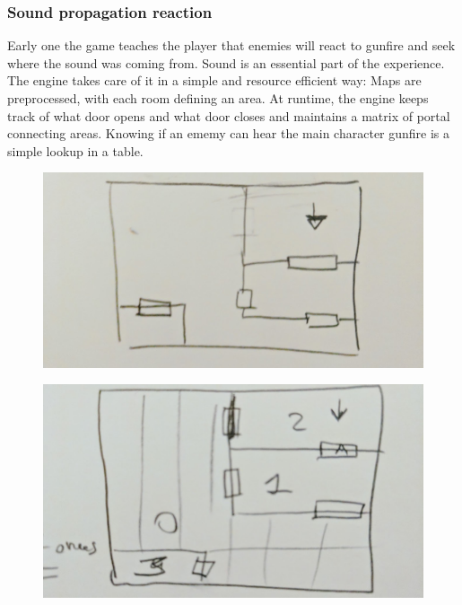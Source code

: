 \subsubsection{Sound propagation reaction}
Early one the game teaches the player that enemies will react to gunfire and seek where the sound was coming from. Sound is an essential part of the experience. The engine takes care of it in a simple and resource efficient way: Maps are preprocessed, with each room defining an area. At runtime, the engine keeps track of what door opens and what door closes and maintains a matrix of portal connecting areas.
Knowing if an ememy can hear the main character gunfire is a simple lookup in a table.

\par
\begin{figure}[H]
 \centering
 \includegraphics[width=\textwidth]{imgs/soud_propagation/map.png}
\end{figure}
\par

\par
\begin{figure}[H]
 \centering
 \includegraphics[width=\textwidth]{imgs/soud_propagation/areas.png}
\end{figure}
\par

